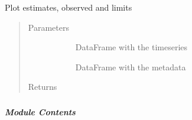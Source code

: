 \documentclass[letterpaper,10pt,english]{sphinxmanual}
\begin{document}
\begin{fulllineitems}
\label{\detokenize{autoapi/src/plot/altair/index:src.plot.altair.plot_all}}
Plot estimates, observed and limits
\begin{quote}\begin{description}
\item[{Parameters}] \leavevmode\begin{description}
\item[{}] \leavevmode{[}\sphinxcode{\sphinxupquote{pd.DataFrame}}{]}
DataFrame with the timeseries

\item[{}] \leavevmode{[}\sphinxcode{\sphinxupquote{pd.DataFrame}}{]}
DataFrame with the metadata

\end{description}

\item[{Returns}] \leavevmode\begin{description}
\item[{  }] \leavevmode
\end{description}

\end{description}\end{quote}

\end{fulllineitems}



\subparagraph{}
\label{\detokenize{autoapi/src/plot/format/index:module-src.plot.format}}\label{\detokenize{autoapi/src/plot/format/index:src-plot-format}}\label{\detokenize{autoapi/src/plot/format/index::doc}}

\subparagraph{Module Contents}
\label{\detokenize{autoapi/src/plot/format/index:module-contents}}
\end{document}
